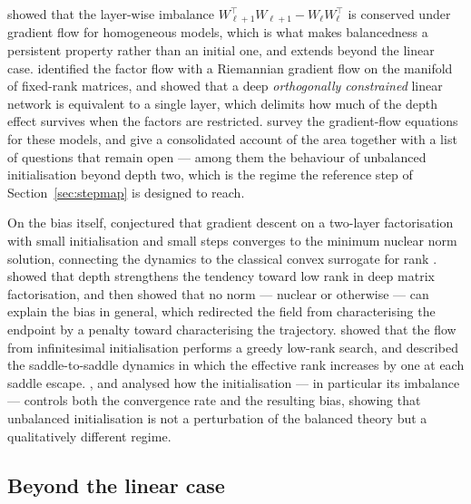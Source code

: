 \documentclass{article} %
\theoremstyle{plain}
\theoremstyle{definition}
\theoremstyle{remark}
\begin{document}
\citet{du2018algorithmic} showed that the layer-wise imbalance
$W_{\ell+1}^\top W_{\ell+1} - W_\ell W_\ell^\top$ is conserved under gradient flow for homogeneous
models, which is what makes balancedness a persistent property rather than an initial one, and
extends beyond the linear case. \citet{bah2022learning} identified the factor flow with a
Riemannian gradient flow on the manifold of fixed-rank matrices, and \citet{ablin2020deep} showed
that a deep \emph{orthogonally constrained} linear network is equivalent to a single layer, which
delimits how much of the depth effect survives when the factors are restricted.
\citet{wendin2026gradient} survey the gradient-flow equations for these models, and
\citet{cohen2024lectures} give a consolidated account of the area together with a list of
questions that remain open --- among them the behaviour of unbalanced initialisation beyond depth
two, which is the regime the reference step of Section~\ref{sec:stepmap} is designed to reach.

On the bias itself, \citet{gunasekar2017implicit} conjectured that gradient descent on a two-layer
factorisation with small initialisation and small steps converges to the minimum nuclear norm
solution, connecting the dynamics to the classical convex surrogate for rank
\citep{srebro2005maximum,recht2010guaranteed}. \citet{arora2019implicit} showed that depth
strengthens the tendency toward low rank in deep matrix factorisation, and
\citet{razin2020implicit} then showed that no norm --- nuclear or otherwise --- can explain the
bias in general, which redirected the field from characterising the endpoint by a penalty toward
characterising the trajectory. \citet{li2021towards} showed that the flow from infinitesimal
initialisation performs a greedy low-rank search, and \citet{jacot2021saddle} described the
saddle-to-saddle dynamics in which the effective rank increases by one at each saddle escape.
\citet{tarmoun2021understanding}, \citet{min2021explicit} and \citet{kunin2024get} analysed how the
initialisation --- in particular its imbalance --- controls both the convergence rate and the
resulting bias, showing that unbalanced initialisation is not a perturbation of the balanced theory
but a qualitatively different regime.

\subsection{Beyond the linear case}
\end{document}
